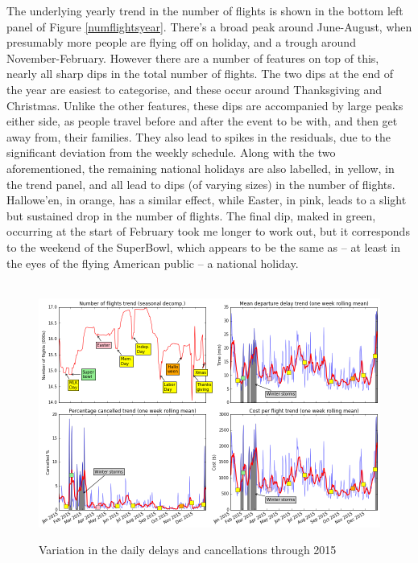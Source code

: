 \documentclass[a4paper]{article}
\begin{document}
The underlying yearly trend in the number of flights is shown in the bottom left panel of Figure \ref{numflightsyear}. There's a broad peak around June-August, when presumably more people are flying off on holiday, and a trough around November-February. However there are a number of features on top of this, nearly all sharp dips in the total number of flights. The two dips at the end of the year are easiest to categorise, and these occur around Thanksgiving and Christmas. Unlike the other features, these dips are accompanied by large peaks either side, as people travel before and after the event to be with, and then get away from, their families. They also lead to spikes in the residuals, due to the significant deviation from the weekly schedule. Along with the two aforementioned, the remaining national holidays are also labelled, in yellow, in the trend panel, and all lead to dips (of varying sizes) in the number of flights. Hallowe'en, in orange, has a similar effect, while Easter, in pink, leads to a slight but sustained drop in the number of flights. The final dip, maked in green, occurring at the start of February took me longer to work out, but it corresponds to the weekend of the SuperBowl, which appears to be the same as -- at least in the eyes of the flying American public -- a national holiday.

\begin{figure}[h]
\centering
\hbox{\hspace{-0.5in}
\includegraphics[width=1.1\textwidth]{../figures/exploration/delays_year.png}}
\caption{Variation in the daily delays and cancellations through 2015}
\label{delaysyear}
\end{figure}
\end{document}
